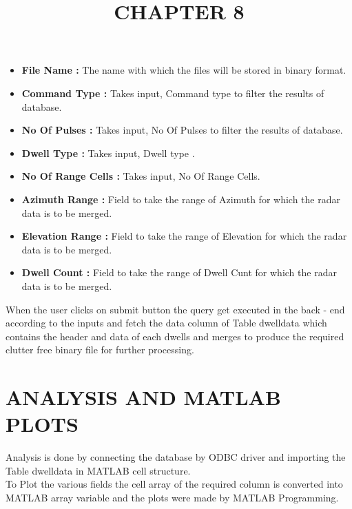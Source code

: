 \documentclass[12pt]{article} %
\begin{document}
  \begin{itemize} 
  \item[] \textbf{File Name : } The name with which the files will be stored in binary format.
  \item[] \textbf{Command Type : }Takes input, Command type to filter the results of database. 
  \item[] \textbf{No Of Pulses : }Takes input, No Of Pulses to filter the results of database. 
  \item[] \textbf{Dwell Type : }Takes input, Dwell type .   
  \item[] \textbf{No Of Range Cells : }Takes input, No Of Range Cells.
  \item[] \textbf{Azimuth Range : }Field to take the range of Azimuth for which the radar data is to be merged.
  \item[] \textbf{Elevation Range : }Field to take the range of Elevation for which the radar data is to be merged.
  \item[] \textbf{Dwell Count : }Field to take the range of Dwell Cunt for which the radar data is to be merged.
  \end{itemize}
  When the user clicks on submit button the query get executed in the back - end according to the inputs and fetch the data column of Table dwelldata which contains the header and data of each dwells and merges to produce the required clutter free binary file for further processing.
 
  \title{\textbf{\huge {CHAPTER 8}}}
\maketitle
\section{ANALYSIS AND MATLAB PLOTS}
\noindent Analysis is done by connecting the database by ODBC driver and importing the Table dwelldata in MATLAB cell structure.
\\
To Plot the various fields the cell array of the required column is converted into MATLAB array variable and the plots were made by MATLAB Programming.
\end{document}
